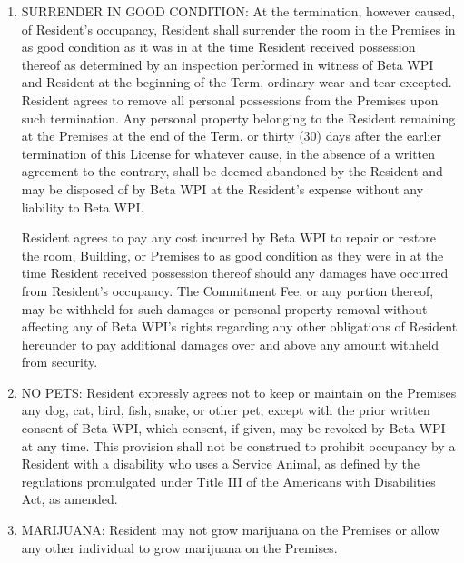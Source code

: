 \documentclass[legalpaper, 12pt]{article} \usepackage{lease}
\begin{document}
\begin{enumerate}
        \item SURRENDER IN GOOD CONDITION: At the termination, however caused,
                of Resident’s occupancy, Resident shall surrender the room in
                the Premises in as good condition as it was in at the time
                Resident received possession thereof as determined by an
                inspection performed in witness of Beta WPI and Resident at the
                beginning of the Term, ordinary wear and tear excepted.
                Resident agrees to remove all personal possessions from the
                Premises upon such termination.  Any personal property belonging
                to the Resident remaining at the Premises at the end of the
                Term, or thirty (30) days after the earlier termination of this
                License for whatever cause, in the absence of a written
                agreement to the contrary, shall be deemed abandoned by the
                Resident and may be disposed of by Beta WPI at the Resident’s
                expense without any liability to Beta WPI\@.

                Resident agrees to pay any cost incurred by Beta WPI to repair
                or restore the room, Building, or Premises to as good condition
                as they were in at the time Resident received possession thereof
                should any damages have occurred from Resident’s occupancy.  The
                Commitment Fee, or any portion thereof, may be withheld for such
                damages or personal property removal without affecting any of
                Beta WPI’s rights regarding any other obligations of Resident
                hereunder to pay additional damages over and above any amount
                withheld from security.

        \item NO PETS:  Resident expressly agrees not to keep or maintain on the
                Premises any dog, cat, bird, fish, snake, or other pet, except
                with the prior written consent of Beta WPI, which consent, if
                given, may be revoked by Beta WPI at any time.  This provision
                shall not be construed to prohibit occupancy by a Resident with
                a disability who uses a Service Animal, as defined by the
                regulations promulgated under Title III of the Americans with
                Disabilities Act, as amended.

        \item MARIJUANA: Resident may not grow marijuana on the Premises or
                allow any other individual to grow marijuana on the Premises.


\end{enumerate}
\end{document}
